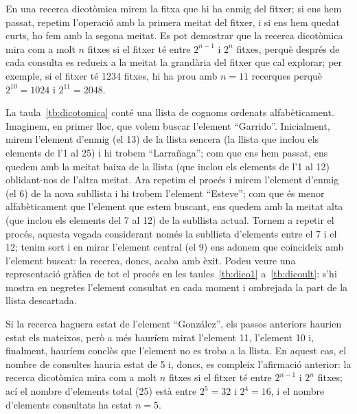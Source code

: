 En una recerca dicotòmica mirem la fitxa que hi ha enmig del
fitxer; si ens hem passat, repetim l'operació amb la primera meitat
del fitxer, i si ens hem quedat curts, ho fem amb la segona meitat. Es
pot demostrar que la recerca dicotòmica mira com a molt $n$ fitxes si
el fitxer té entre $2^{n-1}$ i $2^n$ fitxes, 
  perquè després de cada consulta es redueix a la meitat la
  grandària del fitxer que cal explorar;
per exemple, si el fitxer té
1234 fitxes, hi ha prou amb $n=11$ recerques perquè $2^{10}=1024$ i
$2^{11}=2048$. 

  La taula~\ref{tb:dicotomica} conté una llista de cognoms ordenats
  alfabèticament. Imaginem, en primer lloc, que volem buscar
  l'element ``Garrido''. Inicialment, mirem l'element d'enmig (el 13)
  de la
  llista sencera (la llista que inclou els elements de l'1 al 25) i hi
  trobem ``Larrañaga''; com que ens hem passat, ens quedem amb la
  meitat baixa de la llista (que inclou els elements de l'1 al 12)
  oblidant-nos de l'altra meitat. Ara repetim el procés i mirem
  l'element d'enmig (el 6) de la nova subllista i hi trobem l'element
  ``Esteve''; com que és menor alfabèticament que l'element que estem
  buscant, ens quedem amb la meitat alta (que inclou els elements del
  7 al 12) de la subllista actual. Tornem a repetir el procés, aquesta
  vegada considerant només la subllista d'elements entre el 7 i el 12;
  tenim sort i en mirar l'element central (el 9) ens adonem que
  coincideix amb l'element buscat: la recerca, doncs, acaba amb èxit. 
  Podeu veure una representació gràfica de tot el procés en les
  taules~\ref{tb:dico1} a~\ref{tb:dicoult}: s'hi mostra 
   en negretes l'element consultat
  en cada moment i ombrejada la
  part de la llista descartada.

  Si la recerca haguera estat de l'element ``González'', els passos
  anteriors haurien estat els mateixos, però a més hauríem mirat
  l'element 11, l'element 10 i, finalment, hauríem conclòs que
  l'element no es troba a la llista. En aquest cas, el nombre de
  consultes hauria estat de 5 i, doncs, es compleix l'afirmació
  anterior: la recerca dicotòmica mira com a molt $n$ fitxes si
  el fitxer té entre $2^{n-1}$ i $2^n$ fitxes; ací 
 el nombre d'elements total
  (25) està entre $2^5=32$ i $2^4=16$,
  i el nombre
  d'elements consultats ha estat $n=5$.


